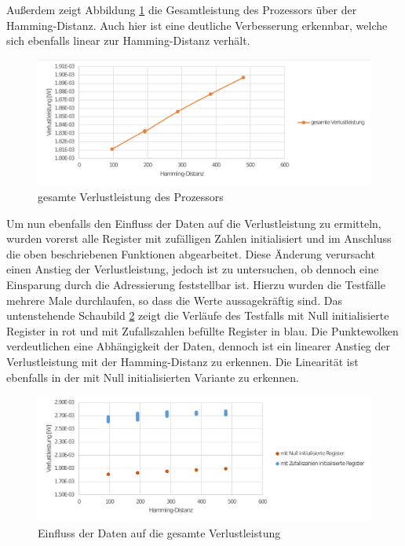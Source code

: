 Außerdem zeigt Abbildung \ref{fig:total_power_source_target} die Gesamtleistung des Prozessors über der Hamming-Distanz. Auch hier ist eine deutliche Verbesserung erkennbar, welche sich ebenfalls linear zur Hamming-Distanz verhält.

\begin{figure}[H]
	\centering
	\includegraphics[width=\textwidth]{fig/total_power_source_target.pdf}
	\caption{gesamte Verlustleistung des Prozessors}
	\label{fig:total_power_source_target}
\end{figure}

Um nun ebenfalls den Einfluss der Daten auf die Verlustleistung zu ermitteln, wurden vorerst alle Register mit zufälligen Zahlen initialisiert und im Anschluss die oben beschriebenen Funktionen abgearbeitet. Diese Änderung verursacht einen Anstieg der Verlustleistung, jedoch ist zu untersuchen, ob dennoch eine Einsparung durch die Adressierung feststellbar ist. Hierzu wurden die Testfälle mehrere Male durchlaufen, so dass die Werte aussagekräftig sind. Das untenstehende Schaubild \ref{fig:random_data_total_power} zeigt die Verläufe des Testfalls mit Null initialisierte Register in rot und mit Zufallszahlen befüllte Register in blau. Die Punktewolken verdeutlichen eine Abhängigkeit der Daten, dennoch ist ein linearer Anstieg der Verlustleistung mit der Hamming-Distanz zu erkennen. Die Linearität ist ebenfalls in der mit Null initialisierten Variante zu erkennen.

\begin{figure}[H]
	\centering
	\includegraphics[width=\textwidth]{fig/random_data_total_power.pdf}
	\caption{Einfluss der Daten auf die gesamte Verlustleistung}
	\label{fig:random_data_total_power}
\end{figure}


